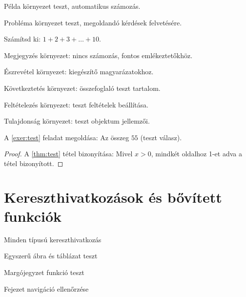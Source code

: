 \documentclass[hu]{../../elegantbook}
\begin{document}
\begin{definition}
\begin{theorem}
\begin{lemma}
\begin{corollary}
\begin{axiom}
\begin{postulate}
\begin{proposition}
\begin{example}\label{exa:test}
Példa környezet teszt, automatikus számozás.
\end{example}

\begin{problem}\label{probl:test}
Probléma környezet teszt, megoldandó kérdések felvetésére.
\end{problem}

\begin{exercise}\label{exer:test}
Számítsd ki: $1+2+3+\dots+10$.
\end{exercise}

\begin{note}
Megjegyzés környezet: nincs számozás, fontos emlékeztetőkhöz.
\end{note}

\begin{remark}
Észrevétel környezet: kiegészítő magyarázatokhoz.
\end{remark}

\begin{conclusion}
Következtetés környezet: összefoglaló teszt tartalom.
\end{conclusion}

\begin{assumption}
Feltételezés környezet: teszt feltételek beállítása.
\end{assumption}

\begin{property}
Tulajdonság környezet: teszt objektum jellemzői.
\end{property}

\begin{solution}
A \ref{exer:test} feladat megoldása: Az összeg $55$ (teszt válasz).
\end{solution}

\begin{proof}
A \ref{thm:test} tétel bizonyítása: Mivel $x>0$, mindkét oldalhoz 1-et adva a tétel bizonyított.
\end{proof}

\chapter{Kereszthivatkozások és bővített funkciók}
\begin{introduction}
\item Minden típusú kereszthivatkozás
\item Egyszerű ábra és táblázat teszt
\item Margójegyzet funkció teszt
\item Fejezet navigáció ellenőrzése
\end{introduction}


\end{proposition}
\end{postulate}
\end{axiom}
\end{corollary}
\end{lemma}
\end{theorem}
\end{definition}
\end{document}
